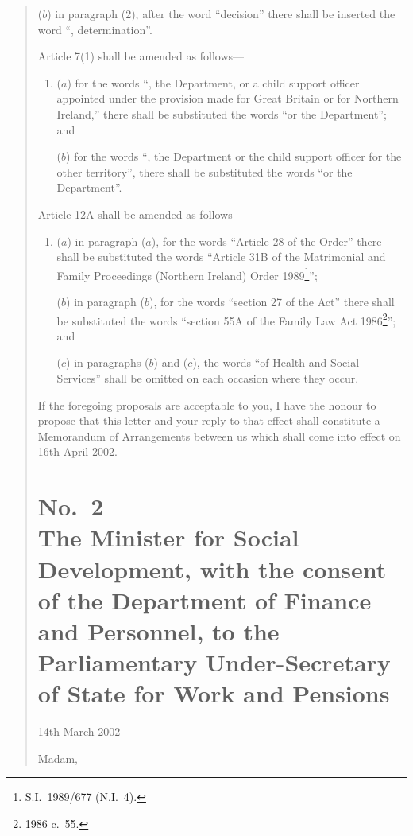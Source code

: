 \documentclass[12pt,a4paper]{article}
\begin{document}
\begin{quotation}
\begin{enumerate}
($b$) in paragraph (2), after the word “decision” there shall be inserted the word “, determination”.
\end{enumerate}

Article 7(1) shall be amended as follows—
\begin{enumerate}\item[]
($a$) for the words “, the Department, or a child support officer appointed under the provision made for Great Britain or for Northern Ireland,” there shall be substituted the words “or the Department”; and

($b$) for the words “, the Department or the child support officer for the other territory”, there shall be substituted the words “or the Department”.
\end{enumerate}

Article 12A shall be amended as follows—
\begin{enumerate}\item[]
($a$) in paragraph ($a$), for the words “Article 28 of the Order” there shall be substituted the words “Article 31B of the Matrimonial and Family Proceedings (Northern Ireland) Order 1989\footnote{S.I.\ 1989/677 (N.I.\ 4).}”;

($b$) in paragraph ($b$), for the words “section 27 of the Act” there shall be substituted the words “section 55A of the Family Law Act 1986\footnote{1986 c.\ 55.}”; and

($c$) in paragraphs ($b$)  and ($c$), the words “of Health and Social Services” shall be omitted on each occasion where they occur.
\end{enumerate}

If the foregoing proposals are acceptable to you, I have the honour to propose that this letter and your reply to that effect shall constitute a Memorandum of Arrangements between us which shall come into effect on 16th April 2002.

\section*{No.\ 2\\The Minister for Social Development, with the consent of the Department of Finance and Personnel, to the Parliamentary Under-Secretary of State for Work and Pensions}

14th March 2002

Madam,


\end{quotation}
\end{document}
